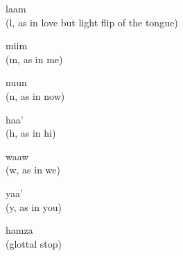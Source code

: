 \documentclass[avery5371,grid,frame]{flashcards}
\begin{document}
\begin{flashcard}{\LARGE laam \\ (l, as in love but light flip of the tongue)}
\LARGE {}
\end{flashcard}
\begin{flashcard}{\LARGE miim \\ (m, as in me)}
\LARGE {}
\end{flashcard}
\begin{flashcard}{\LARGE nuun \\ (n, as in now)}
\LARGE {}
\end{flashcard}
\begin{flashcard}{\LARGE haa' \\ (h, as in hi)}
\LARGE {}
\end{flashcard}
\begin{flashcard}{\LARGE waaw \\ (w, as in we)}
\LARGE {}
\end{flashcard}
\begin{flashcard}{\LARGE yaa' \\ (y, as in you)}
\LARGE {}
\end{flashcard}
\begin{flashcard}{\LARGE hamza \\ (glottal stop)}
\LARGE {}
\end{flashcard}
\end{document}
